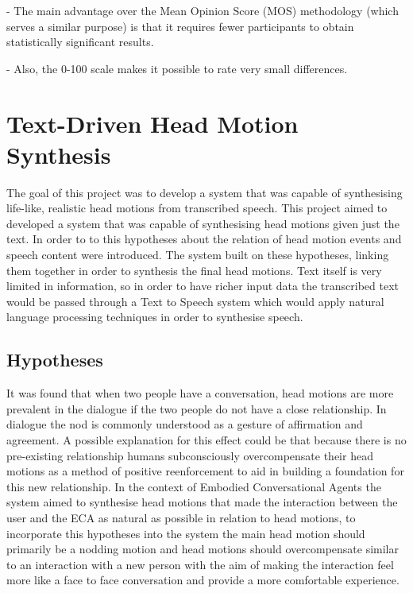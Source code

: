 \documentclass[bsc,frontabs,twoside,singlespacing,parskip]{infthesis}
\begin{document}
- The main advantage over the Mean Opinion Score (MOS) methodology (which serves a similar purpose) is that it requires fewer participants to obtain statistically significant results.

- Also, the 0-100 scale makes it possible to rate very small differences. 

\cite{mushra}


\chapter{Text-Driven Head Motion Synthesis}

The goal of this project was to develop a system that was capable of synthesising life-like, realistic head motions from transcribed speech. This project aimed to developed a system that was capable of synthesising head motions given just the text. In order to to this hypotheses about the relation of head motion events and speech content were introduced. The system built on these hypotheses, linking them together in order to synthesis the final head motions. Text itself is very limited in information, so in order to have richer input data the transcribed text would be passed through a Text to Speech system which would apply natural language processing techniques in order to synthesise speech. 

\section{Hypotheses}

It was  found that when two people have a conversation, head motions are more prevalent in the dialogue if the two people do not have a close relationship. \cite{first_paper} In dialogue the nod is commonly understood as a gesture of affirmation and agreement. A possible explanation for this effect could be that because there is no pre-existing relationship humans subconsciously overcompensate their head motions as a method of positive reenforcement to aid in building a foundation for this new relationship. In the context of Embodied Conversational Agents the system aimed to synthesise head motions that made the interaction between the user and the ECA as natural as possible in relation to head motions, to incorporate this hypotheses into the system the main head motion should primarily be a nodding motion and head motions should overcompensate similar to an interaction with a new person with the aim of making the interaction feel more like a face to face conversation and provide a  more comfortable experience.
\end{document}
